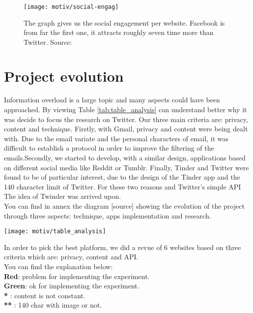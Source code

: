 \begin{figure}[h] 
\centering 
\texttt{[image: motiv/social-engag]} 
\caption[Social Media engagement]{The graph gives us the social engagement per website. Facebook is from far the first one, it attracts roughly seven time more than Twitter. Source: \cite{s_engag_stats}}
\label{fig:engagement} 
\end{figure}

\section{Project evolution}
\paragraph{}
Information overload is a large topic and many aspects could have been approached. By viewing Table \ref{tab:table_analysis} can understand better why it was decide to focus the research on Twitter. Our three main criteria are: privacy, content and technique. Firstly, with Gmail, privacy and content were being dealt with. Due to the email variate and the personal characters of email, it was difficult to establish a protocol in order to improve the filtering of the emails.Secondly, we started to develop, with a similar design, applications based on different social media like Reddit or Tumblr. Finally, Tinder and Twitter were found to be of particular interest, due to the design of the Tinder app and the 140 character limit of Twitter. For these two reasons and Twitter's simple API The idea of Twinder was arrived upon.\\
You can find in annex the diagram [source] showing the evolution of the project through three aspects: technique, apps implementation and research.\\

\begin{table}[tb] 
\centering 
\texttt{[image: motiv/table\_analysis]} 
\caption[Social Media comparison]{In order to pick the best platform, we did a revue of 6 websites based on three criteria which are: privacy, content and API. \\
You can find the explanation below: \\
\textbf{Red}: problem for implementing the experiment. \\
\textbf{Green}: ok for implementing the experiment. \\
\textbf{*} : content is not constant. \\
\textbf{**} : 140 char with image or not. \\
}
\label{tab:table_analysis} 
\end{table}



